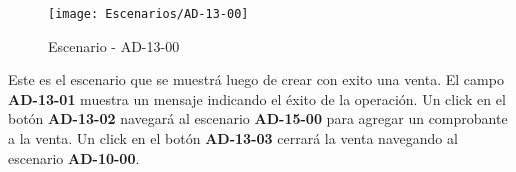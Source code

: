 \begin{figure}[H]
\centering
\texttt{[image: Escenarios/AD-13-00]}
\caption{Escenario - AD-13-00}
\label{fig:AD-13-00}
\end{figure}
Este es el escenario que se muestrá luego de crear con exito una venta. El campo \textbf{AD-13-01} muestra un mensaje indicando el éxito de la operación. Un click en el botón \textbf{AD-13-02} navegará al escenario \textbf{AD-15-00} para agregar un comprobante a la venta. Un click en el botón \textbf{AD-13-03} cerrará la venta navegando al escenario \textbf{AD-10-00}.
\clearpage
